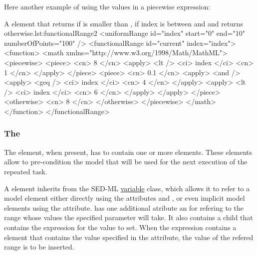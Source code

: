 Here another example of using the values in a piecewise expression: 

\begin{myXmlLst}{A  element that returns  if 
   is smaller than ,  if index is between 
	 and  and returns  otherwise.}{lst:functionalRange2}
        <uniformRange id="index" start="0" end="10" numberOfPoints="100" />
        <functionalRange id="current" index="index">
          <function>
            <math xmlns="http://www.w3.org/1998/Math/MathML">
              <piecewise>
                <piece>
                  <cn> 8 </cn>
                  <apply>
                    <lt />
                    <ci> index </ci>
                    <cn> 1 </cn>
                  </apply>
                </piece>
                <piece>
                  <cn> 0.1 </cn>
                  <apply>
                    <and />
                    <apply>
                      <geq />
                      <ci> index </ci>
                      <cn> 4 </cn>
                    </apply>
                    <apply>
                      <lt />
                      <ci> index </ci>
                      <cn> 6 </cn>
                    </apply>
                  </apply>
                </piece>
                <otherwise>
                  <cn> 8 </cn>
                </otherwise>
              </piecewise>
            </math>
          </function>
        </functionalRange>
\end{myXmlLst}



\subsubsection{The }
\label{class:changes}
\label{class:setValue}

The  element, when present, has to contain one or more  elements. These elements allow to pre-condition the model that will be used for the next execution of the repeated task. %

A  element inherits from the SED-ML \hyperref[class:variable]{variable} class, which allows it to refer to a model element either directly using the attributes  and , or even implicit model elements using the  attribute.  has one additional atribute  an for refering to the range whose values the specified parameter will take. It also contains a child  that contains the expression for the value to set. When the expression contains a  element that contains the value specified in the  attribute, the value of the refered range is to be inserted. 

